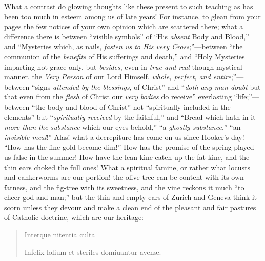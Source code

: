 What a contrast do glowing thoughts like these
present to such teaching as has been too much in esteem among us of
late years! For instance, to glean from your pages the few notices of
your own opinion which are scattered there; what a difference there is
between ``visible symbols'' of ``His \emph{absent} Body and Blood,'' and ``Mysteries
which, as nails, \emph{fasten us to His very Cross};''—between
``the communion of the \emph{benefits} of His sufferings and
death,'' and ``Holy Mysteries imparting not grace only, but \emph{besides},
even in \emph{true and real} though mystical manner, the \emph{Very
Person} of our Lord Himself, \emph{whole, perfect, and entire};''—between
``signs \emph{attended by the blessings}, of Christ'' and ``\emph{doth any
man doubt} but that even from the \emph{flesh} of Christ our \emph{very
bodies} do receive'' everlasting ``life;''—between ``the body and
blood of Christ'' not ``spiritually included in the elements'' but ``\emph{spiritually
received} by the faithful,'' and ``Bread which hath in it \emph{more
than the substance} which our eyes behold,'' ``a \emph{ghostly substance},''
``an \emph{invisible meal}!'' Alas! what a decrepiture has come on us
since Hooker's day! ``How has the fine gold become dim!'' How has the
promise of the spring played us false in the summer! How have the lean
kine eaten up the fat kine, and the thin ears choked the full ones!
What a spiritual famine, or rather what locusts and cankerworms are
our portion! the olive-tree can be content with its own fatness, and
the fig-tree with its sweetness, and the vine reckons it much ``to
cheer god and man;'' but the thin and empty ears of Zurich and Geneva
think it scorn unless they devour and make a clean end of the pleasant
and fair pastures of Catholic doctrine, which are our heritage:

\begin{quote}

Interque
nitentia culta

Infelix lolium et steriles domiuantur avenæ.

\end{quote}

